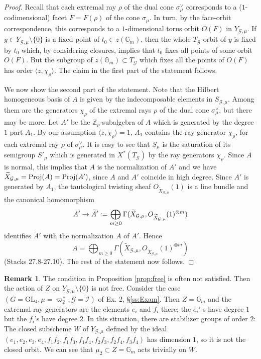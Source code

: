 \documentclass[reqno, 10pt]{amsart}
\makeatletter
\newcommand{\BG}{\ensuremath{\mathbb {G}}\xspace}
\newcommand{\BZ}{\ensuremath{\mathbb {Z}}\xspace}
\newcommand{\CG}{\ensuremath{\mathcal {G}}\xspace}
\newcommand{\CI}{\ensuremath{\mathcal {I}}\xspace}
\newcommand{\GL}{\mathrm{GL}}
\newcommand{\wt}{\widetilde}
\theoremstyle{definition}
\newtheorem{remark}[subsubsection]{Remark}
\numberwithin{equation}{subsection}
\numberwithin{subsubsection}{subsection}
\renewcommand{\to}{%
   \ifbool{@display}{\longrightarrow}{\rightarrow}%
   }
\makeatother
\begin{document}
    
\begin{proof}
 Recall that each extremal ray $\rho$ of the dual cone $\sigma^\vee_\mu$ corresponds to a ($1$-codimensional) facet $F=F(\rho)$ of the cone $\sigma_\mu$. In turn, by
  the face-orbit correspondence, this corresponds to a $1$-dimensional torus orbit $O(F)$ in $Y_{\CG,\mu}$. If $y\in Y_{\CG, \mu}\setminus \{0\}$ is a fixed point of $t_0\in z(\BG_m)$, then the whole $T_\CG$-orbit of $y$ is fixed by $t_0$ which, by considering closures, implies that $t_0$ fixes all points of some  orbit $O(F)$. But the subgroup of $z(\BG_m)\subset T_\CG$ which fixes all the points of $O(F)$ has order $\langle z, \chi_\rho\rangle$. The claim in the first part of the statement follows. 
  
  We now  show the second part of the statement. Note that the Hilbert homogeneous basis of $A$ is given by the indecomposable elements in $S_{\CG, \mu}$. Among them are  the generators $\chi_\rho$ of the extremal rays $\rho$ of the dual cone $\sigma^\vee_\mu$, but there may be more. 
 Let $A'$ be the $\BZ_p$-subalgebra of $A$ which is generated by the degree $1$ part $A_1$. By our assumption $\langle z, \chi_\rho\rangle=1$, $A_1$ contains the ray generator $\chi_\rho$, for each extremal ray $\rho$ of $\sigma_\mu^\vee$. It is easy to see that $S_{\mu}$ is the saturation of its semigroup $S'_\mu$
which is  generated in $X^*(T_\CG)$ by the ray generators $\chi_\rho$. Since $A$ is normal, this implies that $A$ is the normalization of $A'$ and we have $\wt X_{\CG,\mu}={\rm Proj}(A)={\rm Proj}(A')$, since $A$ and $A'$ coincide in high degree. Since $A'$ is generated by $A_1$,  the tautological twisting sheaf $O_{\wt X_{\CG,\mu}}(1)$ is a line bundle and the canonical homomorphism
  \[
  A'\to \wt A':= \bigoplus_{m\geq 0}\Gamma(\wt X_{\CG,\mu}, O_{\wt X_{\CG,\mu}}(1)^{\otimes m})
  \]
  identifies $\wt A'$ with the normalization $A$ of $A'$. Hence
  \[
   A=\bigoplus_{m\geq 0}\Gamma(\wt X_{\CG,\mu}, O_{\wt X_{\CG,\mu}}(1)^{\otimes m})
  \]
  (Stacks 27.8-27.10). The rest of the statement now follows.
  \end{proof}
  
 
 
\begin{remark}\label{ex:notfree} The condition in Proposition \ref{prop:free} is often not satisfied. Then the action of $Z$ on $Y_{\CG, \mu}\setminus \{0\}$ is not free. Consider the case $(G=\GL_4,\mu=\varpi^\vee_2, \CG=\CI)$ of Ex. 2, \S \ref{ss:Exam}.  Then $Z=\BG_m$ and the extremal ray generators are the elements $e_i$ and $f_i$ there;
 the $e_i$' s have degree $1$ but the $f_i$'s have degree $2$. In this situation, there are
 stabilizer groups of order $2$: The closed subscheme $W$ of $Y_{\CG, \mu}$ defined by the ideal
  $(e_1,e_2,e_3,e_4, f_1f_2,f_1f_3,f_1f_4,f_2f_3,f_2f_4, f_3f_4)$ has dimension $1$, so it is not the closed orbit. We can see that  $\mu_2\subset Z=\BG_m$ acts trivially on $W$.   \end{remark} 
 
\end{document}
